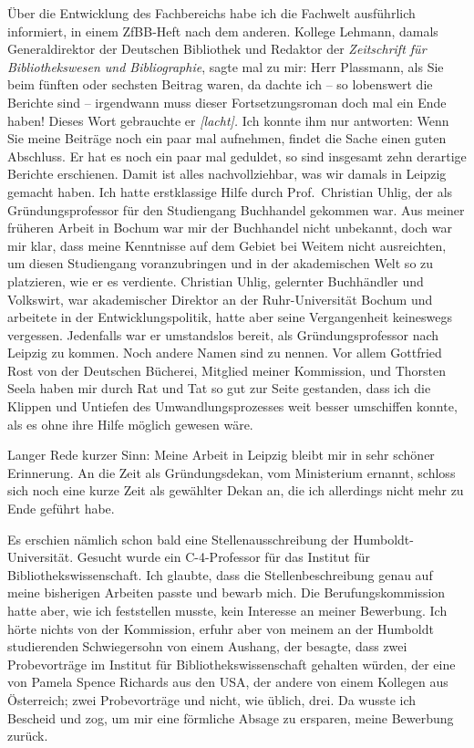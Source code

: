 \documentclass[a4paper,
fontsize=11pt,
oneside,
numbers=noperiodatend,
parskip=half-,
bibliography=totoc,
final
]{scrartcl}
\begin{document}
Über die Entwicklung des Fachbereichs habe ich die Fachwelt ausführlich
informiert, in einem ZfBB-Heft nach dem anderen. Kollege Lehmann, damals
Generaldirektor der Deutschen Bibliothek und Redaktor der
\emph{Zeitschrift für Bibliothekswesen und Bibliographie}, sagte mal zu
mir: Herr Plassmann, als Sie beim fünften oder sechsten Beitrag waren,
da dachte ich -- so lobenswert die Berichte sind -- irgendwann muss
dieser Fortsetzungsroman doch mal ein Ende haben! Dieses Wort gebrauchte
er \emph{{[}lacht{]}.} Ich konnte ihm nur antworten: Wenn Sie meine
Beiträge noch ein paar mal aufnehmen, findet die Sache einen guten
Abschluss. Er hat es noch ein paar mal geduldet, so sind insgesamt zehn
derartige Berichte erschienen. Damit ist alles nachvollziehbar, was wir
damals in Leipzig gemacht haben. Ich hatte erstklassige Hilfe durch
Prof.~Christian Uhlig, der als Gründungsprofessor für den Studiengang
Buchhandel gekommen war. Aus meiner früheren Arbeit in Bochum war mir
der Buchhandel nicht unbekannt, doch war mir klar, dass meine Kenntnisse
auf dem Gebiet bei Weitem nicht ausreichten, um diesen Studiengang
voranzubringen und in der akademischen Welt so zu platzieren, wie er es
verdiente. Christian Uhlig, gelernter Buchhändler und Volkswirt, war
akademischer Direktor an der Ruhr-Universität Bochum und arbeitete in
der Entwicklungspolitik, hatte aber seine Vergangenheit keineswegs
vergessen. Jedenfalls war er umstandslos bereit, als Gründungsprofessor
nach Leipzig zu kommen. Noch andere Namen sind zu nennen. Vor allem
Gottfried Rost von der Deutschen Bücherei, Mitglied meiner Kommission,
und Thorsten Seela haben mir durch Rat und Tat so gut zur Seite
gestanden, dass ich die Klippen und Untiefen des Umwandlungsprozesses
weit besser umschiffen konnte, als es ohne ihre Hilfe möglich gewesen
wäre.

Langer Rede kurzer Sinn: Meine Arbeit in Leipzig bleibt mir in sehr
schöner Erinnerung. An die Zeit als Gründungsdekan, vom Ministerium
ernannt, schloss sich noch eine kurze Zeit als gewählter Dekan an, die
ich allerdings nicht mehr zu Ende geführt habe.

Es erschien nämlich schon bald eine Stellenausschreibung der
Humboldt-Universität. Gesucht wurde ein C-4-Professor für das Institut
für Bibliothekswissenschaft. Ich glaubte, dass die Stellenbeschreibung
genau auf meine bisherigen Arbeiten passte und bewarb mich. Die
Berufungskommission hatte aber, wie ich feststellen musste, kein
Interesse an meiner Bewerbung. Ich hörte nichts von der Kommission,
erfuhr aber von meinem an der Humboldt studierenden Schwiegersohn von
einem Aushang, der besagte, dass zwei Probevorträge im Institut für
Bibliothekswissenschaft gehalten würden, der eine von Pamela Spence
Richards aus den USA, der andere von einem Kollegen aus Österreich; zwei
Probevorträge und nicht, wie üblich, drei. Da wusste ich Bescheid und
zog, um mir eine förmliche Absage zu ersparen, meine Bewerbung zurück.
\end{document}
